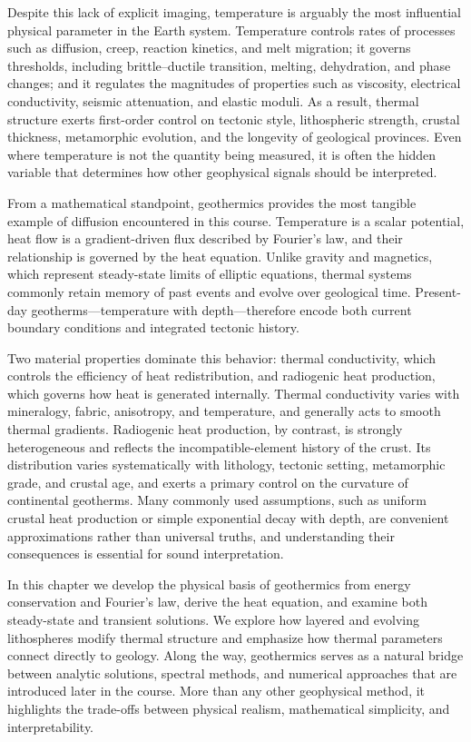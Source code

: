 Despite this lack of explicit imaging, temperature is arguably the most influential physical parameter in the Earth system. Temperature controls rates of processes such as diffusion, creep, reaction kinetics, and melt migration; it governs thresholds, including brittle--ductile transition, melting, dehydration, and phase changes; and it regulates the magnitudes of properties such as viscosity, electrical conductivity, seismic attenuation, and elastic moduli. As a result, thermal structure exerts first-order control on tectonic style, lithospheric strength, crustal thickness, metamorphic evolution, and the longevity of geological provinces. Even where temperature is not the quantity being measured, it is often the hidden variable that determines how other geophysical signals should be interpreted.

From a mathematical standpoint, geothermics provides the most tangible example of diffusion encountered in this course. Temperature is a scalar potential, heat flow is a gradient-driven flux described by Fourier's law, and their relationship is governed by the heat equation. Unlike gravity and magnetics, which represent steady-state limits of elliptic equations, thermal systems commonly retain memory of past events and evolve over geological time. Present-day geotherms---temperature with depth---therefore encode both current boundary conditions and integrated tectonic history.

Two material properties dominate this behavior: thermal conductivity, which controls the efficiency of heat redistribution, and radiogenic heat production, which governs how heat is generated internally. Thermal conductivity varies with mineralogy, fabric, anisotropy, and temperature, and generally acts to smooth thermal gradients. Radiogenic heat production, by contrast, is strongly heterogeneous and reflects the incompatible-element history of the crust. Its distribution varies systematically with lithology, tectonic setting, metamorphic grade, and crustal age, and exerts a primary control on the curvature of continental geotherms. Many commonly used assumptions, such as uniform crustal heat production or simple exponential decay with depth, are convenient approximations rather than universal truths, and understanding their consequences is essential for sound interpretation.

In this chapter we develop the physical basis of geothermics from energy conservation and Fourier's law, derive the heat equation, and examine both steady-state and transient solutions. We explore how layered and evolving lithospheres modify thermal structure and emphasize how thermal parameters connect directly to geology. Along the way, geothermics serves as a natural bridge between analytic solutions, spectral methods, and numerical approaches that are introduced later in the course. More than any other geophysical method, it highlights the trade-offs between physical realism, mathematical simplicity, and interpretability.

